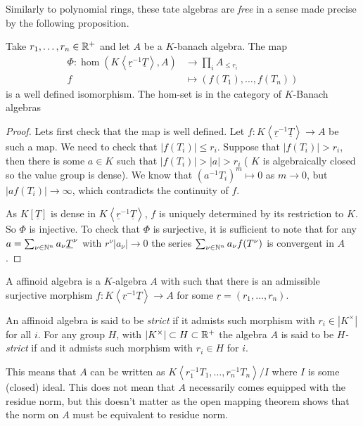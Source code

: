 Similarly to polynomial rings, these tate algebras are \emph{free} in a sense made precise by the following proposition. 
\begin{proposition}\label{prop:universal_property_tate_algebars}
	Take $r_1, \ldots, r_n \in \mathbb{R}^{ +}$ and let $A$ be a $K$-banach algebra. 
	The map
	\begin{align*}
		\Phi: \hom(K\left<\underline r^{-1} \underline T \right>, A) &\longrightarrow \prod_i A_{\le r_i}  \\
		f &\longmapsto (f(T_1), \ldots, f(T_n))
	\end{align*}
	is a well defined isomorphism. 
	The hom-set is in the category of $K$-Banach algebras
\end{proposition}
\begin{proof}
	Lets first check that the map is well defined. 
	Let $f: K\left<\underline r^{-1} \underline T \right> \to A$ be such a map. 
	We need to check that $|f(T_i)| \le r_i$. 
	Suppose that  $|f(T_i)| > r_i$, then there is some $a \in K$ such that $|f(T_i)| > |a| > r_i$ ( $K$ is algebraically closed so the value group is dense). 
	We know that $(a^{-1}T_i)^{m} \mapsto 0$ as $m \to 0$, but $|a f(T_i)| \to \infty $, which contradicts the continuity of $f$. 


	As $K[\underline T]$ is dense in $K\left<\underline r^{-1} \underline T \right>$, $f$ is uniquely determined by its restriction to $K$. So $\Phi$ is injective.
	To check that $\Phi$ is surjective, it is sufficient to note that for any $a = \sum_{\nu \in \mathbb{N}^{n}}^{} a_\nu \underline T^{\nu}$ with $r^{\nu} |a_\nu| \to 0$ the series $\sum_{\nu \in \mathbb{N}^{n}} a_\nu f(T^{\nu})$ is convergent in $A$. 
\end{proof}


\begin{definition}
	A affinoid algebra is a $K$-algebra $A$ with such that there is an admissible surjective morphism $f: K\left<\underline r ^{-1} \underline T \right> \to A$ for some $\underline r = (r_1, \ldots, r_n)$. 

	An affinoid algebra is said to be \emph{strict} if it admists such morphism with $r_i  \in |K^{\times }|$ for all $i$. 
	For any group $H$, with $|K^{\times }| \subset  H \subset \mathbb{R}^{ +}$ the algebra $A$ is said to be \emph{$H$-strict} if and it admists such morphism with $r_i \in H$ for $i$. 
\end{definition}
This means that $A$ can be written as $K\left<r_1^{-1}T_1, \ldots, r_n^{-1}T_n \right> / I$ where $I$ is some (closed) ideal.
This does not mean that $A$ necessarily comes equipped with the residue norm, but this doesn't matter as the open mapping theorem shows that the norm on $A$ must be equivalent to residue norm.


